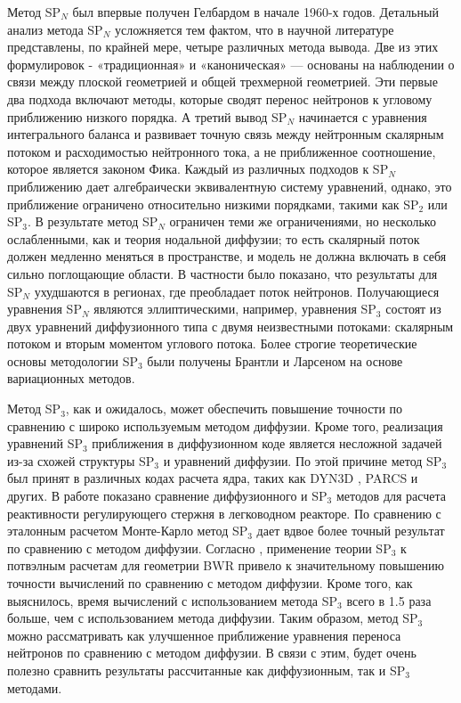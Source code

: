 \documentclass{crm-article}
\begin{document}
Метод SP$_N$ был впервые получен Гелбардом \cite{gelbard1961} в начале 1960-х годов.
Детальный анализ метода SP$_N$ усложняется тем фактом, что в научной литературе представлены, по крайней мере, четыре различных метода вывода.
Две из этих формулировок - «традиционная» и «каноническая» --- основаны на наблюдении о связи между плоской геометрией и общей трехмерной геометрией.
Эти первые два подхода включают методы, которые сводят перенос нейтронов к угловому приближению низкого порядка.
А третий вывод SP$_N$ начинается с уравнения интегрального баланса и развивает точную связь между нейтронным скалярным потоком и расходимостью нейтронного тока, а не приближенное соотношение, которое является законом Фика.
Каждый из различных подходов к SP$_N$ приближению дает алгебраически эквивалентную систему уравнений, однако, это приближение ограничено относительно низкими порядками, такими как SP$_2$ или SP$_3$.
В результате метод SP$_N$ ограничен теми же ограничениями, но несколько ослабленными, как и теория нодальной диффузии; то есть скалярный поток должен медленно меняться в пространстве, и модель не должна включать в себя сильно поглощающие области. 
В частности было показано, что результаты для SP$_N$ ухудшаются в регионах, где преобладает поток нейтронов.
Получающиеся уравнения SP$_N$ являются эллиптическими, например, уравнения SP$_3$ состоят из двух уравнений диффузионного типа с двумя неизвестными потоками: скалярным потоком и вторым моментом углового потока.
Более строгие теоретические основы методологии SP$_3$ были получены Брантли и Ларсеном \cite{brantley2000} на основе вариационных методов.

Метод SP$_3$, как и ожидалось, может обеспечить повышение точности по сравнению с широко используемым методом диффузии.
Кроме того, реализация уравнений SP$_3$ приближения в диффузионном коде является несложной задачей из-за схожей структуры SP$_3$ и уравнений диффузии.
По этой причине метод SP$_3$ был принят в различных кодах расчета ядра, таких как DYN3D \cite{beckert2008}, PARCS \cite{downar2009} и других. 
В работе \cite{brewster2018} показано сравнение диффузионного и SP$_3$ методов для расчета реактивности регулирующего стержня в легководном реакторе.
По сравнению с эталонным расчетом Монте-Карло метод SP$_3$ дает вдвое более точный результат по сравнению с методом диффузии. 
Согласно \cite{tada2008}, применение теории SP$_3$ к потвэлным расчетам для геометрии BWR привело к значительному повышению точности вычислений по сравнению с методом диффузии.
Кроме того, как выяснилось, время вычислений с использованием метода SP$_3$ всего в 1.5 раза больше, чем с использованием метода диффузии.
Таким образом, метод SP$_3$ можно рассматривать как улучшенное приближение уравнения переноса нейтронов по сравнению с методом диффузии.
В связи с этим, будет очень полезно сравнить результаты рассчитанные как диффузионным, так и SP$_3$ методами.
\end{document}
